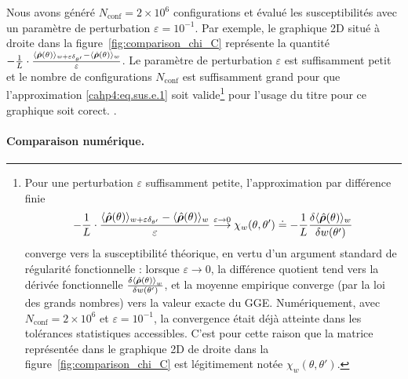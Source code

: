 Nous avons généré \(N_{\text{conf}} = 2\times 10^6\) configurations et évalué les susceptibilités avec un paramètre de perturbation 
\(\varepsilon = 10^{-1}\). Par exemple, le graphique 2D situé à droite dans la figure~\eqref{fig:comparison_chi_C} représente la quantité \( -\frac{1}{L} \cdot \frac{ \langle \hat{\bm{\rho}}(\theta) \rangle_{w + \varepsilon \delta_{\theta'}} -  \langle\hat{\bm{\rho}} (\theta) \rangle_w }{ \varepsilon } \). Le paramètre de perturbation \(\varepsilon\) est suffisamment petit et le nombre de configurations $N_{\text{conf}}$ est suffisamment grand pour que
l’approximation \eqref{cahp4:eq.sus.e.1} soit valide\footnote{%
Pour une perturbation $\varepsilon$ suffisamment petite, l’approximation par différence finie
\[
 -\frac{1}{L} \cdot \frac{ \langle \hat{\bm{\rho}}(\theta) \rangle_{w + \varepsilon \delta_{\theta'}} -  \langle\hat{\bm{\rho}} (\theta) \rangle_w }{ \varepsilon }  \overset{\varepsilon \to 0 }{\longrightarrow }\chi_w(\theta, \theta')  \doteq -\frac{1}{L} \frac{\delta \langle \hat{\bm{\rho}}(\theta) \rangle_w}{\delta w(\theta')}
\]
converge vers la susceptibilité théorique, en vertu d’un argument standard de régularité fonctionnelle : lorsque $\varepsilon\to 0$, la différence quotient tend vers la dérivée fonctionnelle $\frac{\delta \braket{\hat{\bm{\rho}}(\theta)}_w}{\delta w(\theta')}$, et la moyenne empirique converge (par la loi des grands nombres) vers la valeur exacte du \gls{GGE}. 
Numériquement, avec $N_{\text{conf}} = 2\times 10^6$ et $\varepsilon = 10^{-1}$, la convergence était déjà atteinte dans les tolérances statistiques accessibles. 
C’est pour cette raison que la matrice représentée dans le graphique 2D de droite dans la figure~\eqref{fig:comparison_chi_C} est légitimement notée 
$\chi_w(\theta,\theta')$.}  pour l'usage du titre  pour ce graphique soit corect. %
.

\medskip


\paragraph{Comparaison numérique.}
%

